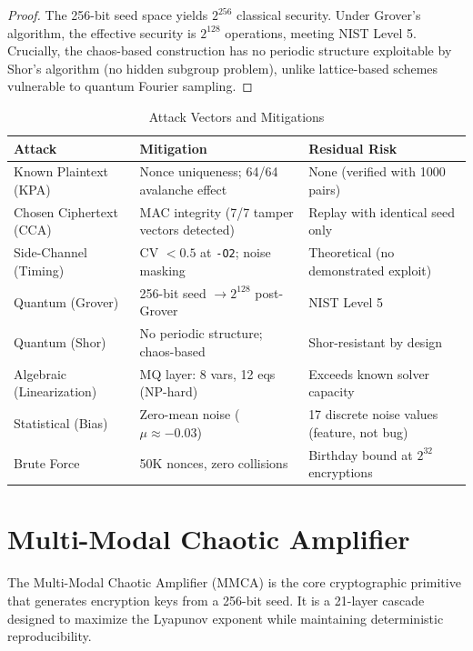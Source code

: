 \documentclass[11pt,a4paper]{article}
\begin{document}
\begin{proof}
The 256-bit seed space yields $2^{256}$ classical security. Under Grover's algorithm, the effective security is $2^{128}$ operations, meeting NIST Level 5. Crucially, the chaos-based construction has no periodic structure exploitable by Shor's algorithm (no hidden subgroup problem), unlike lattice-based schemes vulnerable to quantum Fourier sampling.
\end{proof}

\begin{table}[H]
\centering
\caption{Attack Vectors and Mitigations}
\label{tab:attacks}
\begin{tabular}{@{}p{3cm}p{5cm}p{4.5cm}@{}}
\toprule
\textbf{Attack} & \textbf{Mitigation} & \textbf{Residual Risk} \\
\midrule
Known Plaintext (KPA) & Nonce uniqueness; 64/64 avalanche effect & None (verified with 1000 pairs) \\
Chosen Ciphertext (CCA) & MAC integrity (7/7 tamper vectors detected) & Replay with identical seed only \\
Side-Channel (Timing) & CV $<0.5$ at \texttt{-O2}; noise masking & Theoretical (no demonstrated exploit) \\
Quantum (Grover) & 256-bit seed $\to 2^{128}$ post-Grover & NIST Level 5 \\
Quantum (Shor) & No periodic structure; chaos-based & Shor-resistant by design \\
Algebraic (Linearization) & MQ layer: 8 vars, 12 eqs (NP-hard) & Exceeds known solver capacity \\
Statistical (Bias) & Zero-mean noise ($\mu \approx -0.03$) & 17 discrete noise values (feature, not bug) \\
Brute Force & 50K nonces, zero collisions & Birthday bound at $2^{32}$ encryptions \\
\bottomrule
\end{tabular}
\end{table}

\newpage

\section{Multi-Modal Chaotic Amplifier}
\label{sec:mmca}

The Multi-Modal Chaotic Amplifier (MMCA) is the core cryptographic primitive that generates encryption keys from a 256-bit seed. It is a 21-layer cascade designed to maximize the Lyapunov exponent while maintaining deterministic reproducibility.
\end{document}
